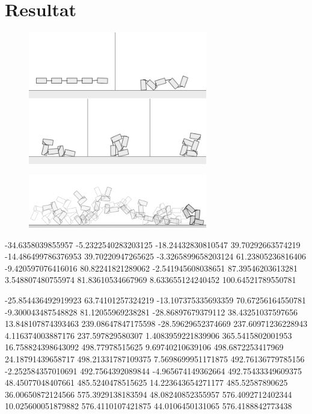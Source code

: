 \documentclass[titlepage, twocolumn, a4paper, 12pt]{article}
\begin{document}
\section{Resultat}
\begin{figure}
    \includegraphics[width=78mm]{images/mask1_gs.png}
\end{figure}

\begin{figure}
    \includegraphics[width=78mm]{images/maskninja.png}
\end{figure}

-34.6358039855957	-5.2322540283203125
-18.24432830810547	39.70292663574219
-14.486499786376953	39.70220947265625
-3.3265899658203124	61.23805236816406
-9.420597076416016	80.82241821289062
-2.541945608038651	87.39546203613281
3.548807480755974	81.83610534667969
8.633655124240452	100.64521789550781


-25.854436492919923	63.74101257324219
-13.107375335693359	70.67256164550781
-9.300043487548828	81.12055969238281
-28.86897679379112	38.43251037597656
13.848107874393463	239.08647847175598
-28.59629652374669	237.60971236228943
4.116374003887176	237.597829580307
1.4083959221839906	365.5415802001953
16.758824398643092	498.77978515625
9.69740210639106	498.6872253417969
24.18791439658717	498.21331787109375
7.5698699951171875	492.76136779785156
-2.252584357010691	492.7564392089844
-4.965674149362664	492.75433349609375
48.45077048407661	485.5240478515625
14.223643654271177	485.52587890625
36.00650872124566	575.3929138183594
48.08240852355957	576.4092712402344
10.025600051879882	576.4110107421875
44.0106450131065	576.4188842773438
\end{document}
